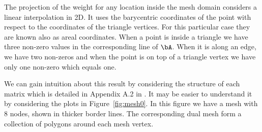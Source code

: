 The projection of the weight for any 
location inside the mesh domain 
considers a linear interpolation in 2D. 
It uses the barycentric coordinates of the point 
with respect to the coordinates of the triangle vertices. 
For this particular case they are known also as 
areal coordinates. 
When a point is inside a triangle 
we have three non-zero values in the corresponding line of $\bA$. 
When it is along an edge, we have two non-zeros 
and when the point is on top of a triangle vertex 
we have only one non-zero which equals one. 



We can gain intuition about this result by 
considering the structure of each matrix 
which is detailed in Appendix A.2 in \cite{lindgrenRL:2011}. 
It may be easier to understand it by considering 
the plots in Figure~\ref{fig:mesh0}. 
In this figure we have a mesh
with 8 nodes,
shown in thicker border lines. 
The corresponding dual mesh form 
a collection of polygons 
around each mesh vertex. 

